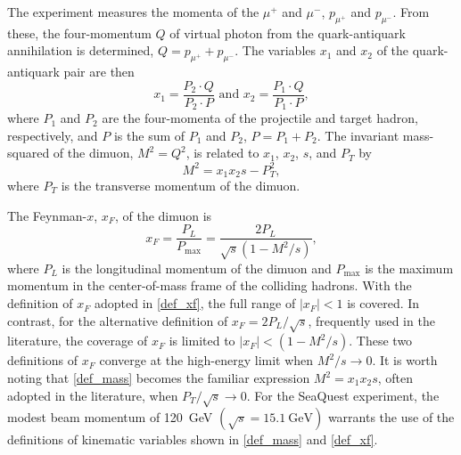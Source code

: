 \documentclass[reprint,aps,unsortedaddress,superscriptaddress,prl,floatfix,showpacs,linenumbers,final]{revtex4-2}
\begin{document}
The experiment measures the momenta of the $\mu^+$ and $\mu^-$, $p_{\mu^+}$ and $p_{\mu^-}$.
From these, the four-momentum $Q$ of virtual photon from the quark-antiquark annihilation is determined,
$Q = p_{\mu^+} + p_{\mu^-}$.
The variables $x_1$ and $x_2$ of the quark-antiquark pair are then
\begin{equation}
	x_1 = \frac{P_2 \cdot Q}{P_2 \cdot P} \text{ and } x_2 =
	\frac{P_1 \cdot Q}{P_1 \cdot P},
	\label{def_x1x2}
\end{equation}
where $P_1$ and $P_2$ are the four-momenta of the projectile and target hadron,
respectively, and $P$ is the sum of $P_1$ and $P_2$, $P=P_1+P_2$.
The invariant mass-squared of the dimuon, $M^2 = Q^2$, is related to $x_1$, $x_2$, $s$, and $P_T$ by
\begin{equation}
	M^2=x_1 x_2 s - P_T^2,
	\label{def_mass}
\end{equation}
where $P_T$ is the transverse momentum of the dimuon.

The Feynman-$x$, $x_F$, of the dimuon is
\begin{equation}
	x_F = \frac{P_L}{P_{\text{max}}} = \frac{2P_L}{\sqrt{s}\left(1-M^2/s\right)},
	\label{def_xf}
\end{equation}
where $P_L$ is the longitudinal momentum of the dimuon and $P_\textrm{max}$ is the maximum momentum in the center-of-mass frame of the colliding hadrons.
With the definition of $x_F$ adopted in \cref{def_xf},
the full range of $\left|x_F\right| < 1$ is covered.
In contrast, for the alternative definition of $x_F = 2P_L/\sqrt{s}$,
frequently used in the literature,
the coverage of $x_F$ is limited to $\left|x_F\right| <\left(1-M^2/s\right)$.
These two definitions of $x_F$ converge at the high-energy limit when $M^2/s \to 0$.
It is worth noting that \cref{def_mass} becomes the familiar expression $M^2=x_1 x_2 s$,
often adopted in the literature, when $P_T/\sqrt{s} \to 0$.
For the SeaQuest experiment, the modest beam momentum of \SI{120}{\GeV} $\left(\sqrt{s} = \SI{15.1}{\GeV}\right)$
warrants the use of the definitions of kinematic variables shown in \cref{def_mass} and \ref{def_xf}.
\end{document}
